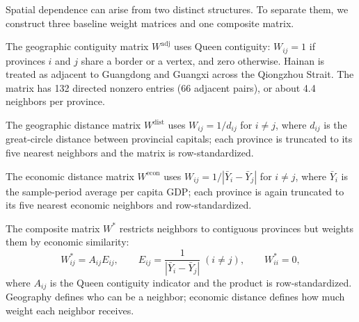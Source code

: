 \documentclass[economies,article,submit,moreauthors]{Definitions/mdpi}
\begin{document}
Spatial dependence can arise from two distinct structures. To separate them, we construct three baseline weight matrices and one composite matrix.

The geographic contiguity matrix $W^{\mathrm{adj}}$ uses Queen contiguity: $W_{ij}=1$ if provinces $i$ and $j$ share a border or a vertex, and zero otherwise. Hainan is treated as adjacent to Guangdong and Guangxi across the Qiongzhou Strait. The matrix has 132 directed nonzero entries (66 adjacent pairs), or about 4.4 neighbors per province.

The geographic distance matrix $W^{\mathrm{dist}}$ uses $W_{ij}=1/d_{ij}$ for $i\neq j$, where $d_{ij}$ is the great-circle distance between provincial capitals; each province is truncated to its five nearest neighbors and the matrix is row-standardized.

The economic distance matrix $W^{\mathrm{econ}}$ uses $W_{ij}=1/|\bar Y_i-\bar Y_j|$ for $i\neq j$, where $\bar Y_i$ is the sample-period average per capita GDP; each province is again truncated to its five nearest economic neighbors and row-standardized.

The composite matrix $W^{*}$ restricts neighbors to contiguous provinces but weights them by economic similarity:
\begin{equation}
W^{*}_{ij}=A_{ij}E_{ij},
\qquad
E_{ij}=\frac{1}{|\bar Y_i-\bar Y_j|}\;(i\neq j),
\qquad
W^{*}_{ii}=0,
\label{eq:composite_w}
\end{equation}
where $A_{ij}$ is the Queen contiguity indicator and the product is row-standardized. Geography defines who can be a neighbor; economic distance defines how much weight each neighbor receives.
\end{document}
